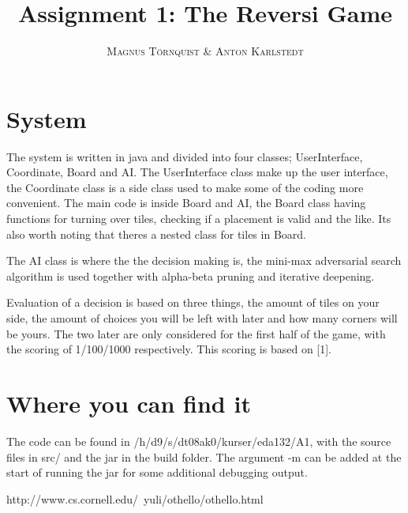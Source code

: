 \documentclass[twoside]{article}
\title{\vspace{-15mm}\fontsize{24pt}{10pt}\selectfont\textbf{Assignment 1: The Reversi Game}} %
\author{
\large
\textsc{
Magnus T\"{o}rnquist \&
Anton Karlstedt}\\[2mm] %
\vspace{-5mm}
}
\date{}
\begin{document}
\maketitle %

\thispagestyle{fancy} %

\section{System} %
The system is written in java and divided into four classes; UserInterface, Coordinate, Board and AI. The UserInterface class make up the user interface, the Coordinate class is a side class used to make some of the coding more convenient. The main code is inside Board and AI, the Board class having functions for turning over tiles, checking if a placement is valid and the like. Its also worth noting that theres a nested class for tiles in Board.

The AI class is where the the decision making is, the mini-max adversarial search algorithm is used together with alpha-beta pruning and iterative deepening.

Evaluation of a decision is based on three things, the amount of tiles on your side, the amount of choices you will be left with later and how many corners will be yours. The two later are only considered for the first half of the game, with the scoring of 1/100/1000 respectively. This scoring is based on [1].
\section{Where you can find it}
The code can be found in /h/d9/s/dt08ak0/kurser/eda132/A1, with the source files in src/ and the jar in the build folder. The argument -m can be added at the start of running the jar for some additional debugging output.


\begin{thebibliography}{99} %

  http://www.cs.cornell.edu/~yuli/othello/othello.html


\end{thebibliography}

\end{document}
